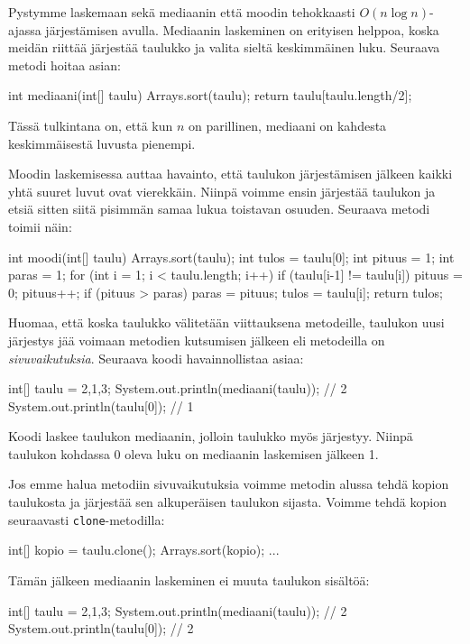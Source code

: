 Pystymme laskemaan sekä mediaanin että moodin tehokkaasti
$O(n \log n)$-ajassa järjestämisen avulla.
Mediaanin laskeminen on erityisen helppoa,
koska meidän riittää järjestää taulukko ja valita
sieltä keskimmäinen luku. Seuraava metodi hoitaa asian:

\begin{code}
int mediaani(int[] taulu) {
    Arrays.sort(taulu);
    return taulu[taulu.length/2];
}
\end{code}

Tässä tulkintana on, että kun $n$ on parillinen, mediaani
on kahdesta keskimmäisestä luvusta pienempi.

Moodin laskemisessa auttaa havainto, että taulukon järjestämisen
jälkeen kaikki yhtä suuret luvut ovat vierekkäin.
Niinpä voimme ensin järjestää taulukon ja etsiä sitten siitä
pisimmän samaa lukua toistavan osuuden.
Seuraava metodi toimii näin:

\begin{code}
int moodi(int[] taulu) {
    Arrays.sort(taulu);
    int tulos = taulu[0];
    int pituus = 1;
    int paras = 1;
    for (int i = 1; i < taulu.length; i++) {
        if (taulu[i-1] != taulu[i]) pituus = 0;
        pituus++;
        if (pituus > paras) {
            paras = pituus;
            tulos = taulu[i];
        }
    }
    return tulos;
}
\end{code}

Huomaa, että koska taulukko välitetään viittauksena metodeille,
taulukon uusi järjestys jää voimaan metodien kutsumisen jälkeen
eli metodeilla on \emph{sivuvaikutuksia}.
Seuraava koodi havainnollistaa asiaa:

\begin{code}
int[] taulu = {2,1,3};
System.out.println(mediaani(taulu)); // 2
System.out.println(taulu[0]); // 1
\end{code}

Koodi laskee taulukon mediaanin, jolloin taulukko
myös järjestyy. Niinpä taulukon kohdassa 0 oleva luku
on mediaanin laskemisen jälkeen 1.

Jos emme halua metodiin sivuvaikutuksia voimme metodin
alussa tehdä kopion taulukosta ja järjestää sen alkuperäisen
taulukon sijasta. Voimme tehdä kopion seuraavasti \texttt{clone}-metodilla:

\begin{code}
int[] kopio = taulu.clone();
Arrays.sort(kopio);
...
\end{code}

Tämän jälkeen mediaanin laskeminen ei
muuta taulukon sisältöä:

\begin{code}
int[] taulu = {2,1,3};
System.out.println(mediaani(taulu)); // 2
System.out.println(taulu[0]); // 2
\end{code}
